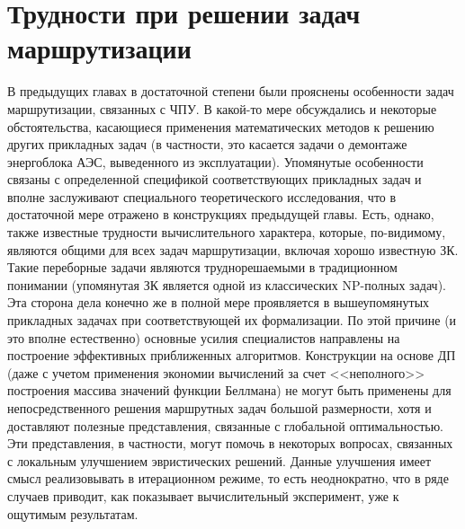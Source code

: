 
\section{
  Трудности при решении
  задач маршрутизации
}
\label{sect:4.1}
\setcounter{equation}{0}

В предыдущих главах в достаточной степени были прояснены особенности задач
маршрутизации, связанных с ЧПУ.
В какой-то мере обсуждались и некоторые
обстоятельства, касающиеся применения математических методов к решению других
прикладных задач
(в частности, это касается задачи о демонтаже энергоблока
АЭС, выведенного из эксплуатации).
Упомянутые особенности связаны
с определенной спецификой соответствующих прикладных задач
и вполне
заслуживают специального теоретического исследования,
что в достаточной
мере отражено в конструкциях предыдущей главы.
Есть, однако, также
известные трудности вычислительного характера, которые, по-видимому,
являются общими для всех задач  маршрутизации,
включая хорошо известную ЗК.
Такие переборные задачи являются труднорешаемыми в традиционном понимании
(упомянутая ЗК является одной из классических NP-полных задач).
Эта сторона дела конечно же в полной мере проявляется
в вышеупомянутых
прикладных задачах при соответствующей  их формализации.
По этой причине
(и это вполне естественно)
основные усилия специалистов направлены
на построение эффективных приближенных алгоритмов.
Конструкции на основе ДП
(даже с учетом применения экономии вычислений за счет <<неполного>>
построения массива значений функции Беллмана)
не могут быть применены для
непосредственного решения маршрутных задач большой размерности,
хотя и доставляют полезные представления,
связанные с глобальной оптимальностью.
Эти представления, в частности, могут помочь в некоторых вопросах,
связанных с локальным улучшением эвристических решений.
Данные улучшения
имеет смысл реализовывать в итерационном режиме, то есть неоднократно,
что в ряде случаев приводит, как показывает вычислительный эксперимент,
уже к ощутимым результатам.

